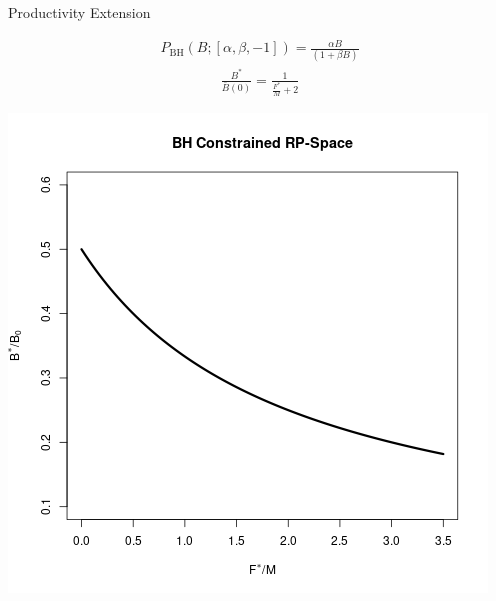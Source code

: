 \documentclass[ xcolor = pdftex, dvipsnames, table ]{beamer}
\begin{document}
%
\begin{frame}{Productivity Extension}
\begin{minipage}[h!]{0.49\textwidth}
\begin{align}
P_\text{BH}(B;[\alpha, \beta, -1]) = \frac{\alpha B}{(1+\beta B)} \nonumber
\end{align}
\begin{align}
\frac{B^*}{\bar B(0)} = \frac{1}{\frac{F^*}{M}+2} \nonumber
\end{align}
\end{minipage}
\begin{minipage}[h!]{0.49\textwidth}
\includegraphics[width=\textwidth]{../plots/bhRP.png}
\end{minipage}
\end{frame}
\end{document}

